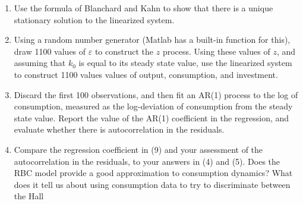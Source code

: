 \documentclass[11pt]{article}
\begin{document}
\begin{enumerate}
\newpage
\item Use the formula of Blanchard and Kahn to show that there is a unique
stationary solution to the linearized system.

\newpage
\item Using a random number generator (Matlab has a built-in function for
this), draw 1100 values of $\varepsilon$ to construct the $z$ process. Using these values of $z$,
and assuming that $k_0$ is equal to its steady state value, use the linearized system
to construct 1100 values values of output, consumption, and investment.

\newpage
\item Discard the first 100 observations, and then fit an AR(1) process to the
log of consumption, measured as the log-deviation of consumption from the
steady state value. Report the value of the AR(1) coefficient in the regression,
and evaluate whether there is autocorrelation in the residuals.

\newpage
\item Compare the regression coefficient in (9) and your assessment of the
autocorrelation in the residuals, to your answers in (4) and (5). Does the RBC
model provide a good approximation to consumption dynamics? What does it
tell us about using consumption data to try to discriminate between the Hall
\end{enumerate}
\end{document}
